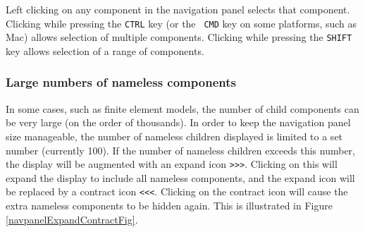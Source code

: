 \documentclass{article}
\begin{document}
Left clicking on any component in the navigation panel selects that
component. Clicking while pressing the {\tt CTRL} key (or the {\tt
CMD} key on some platforms, such as Mac) allows selection of multiple
components. Clicking while pressing the {\tt SHIFT} key allows
selection of a range of components.

\subsubsection{Large numbers of nameless components}

In some cases, such as finite element models, the number of child
components can be very large (on the order of thousands). In order to
keep the navigation panel size manageable, the number of nameless
children displayed is limited to a set number (currently 100).  If the
number of nameless children exceeds this number, the display will be
augmented with an expand icon {\tt >{}>{}>}. Clicking on this will expand the
display to include all nameless components, and the expand icon will
be replaced by a contract icon {\tt <{}<{}<}. Clicking on the contract icon
will cause the extra nameless components to be hidden again.
This is illustrated in Figure \ref{navpanelExpandContractFig}.
\end{document}
